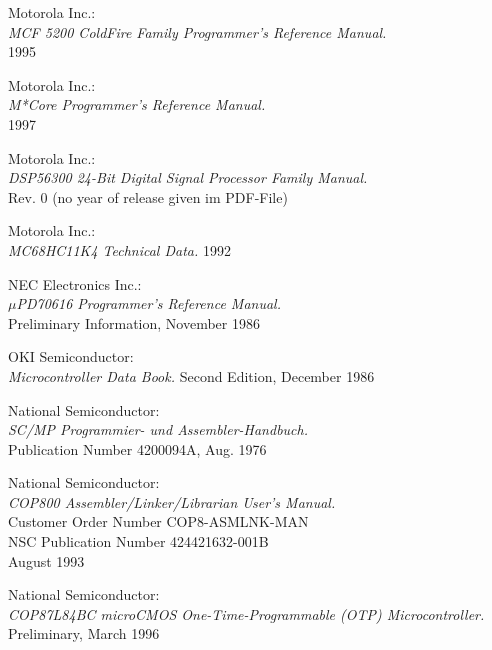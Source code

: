  Motorola Inc.: \\
                  {\em MCF 5200 ColdFire Family Programmer's Reference
                   Manual.\/} \\
                  1995

 Motorola Inc.: \\
                   {\em M*Core Programmer's Reference Manual.\/} \\
                   1997

 Motorola Inc.: \\
                   {\em DSP56300 24-Bit Digital Signal Processor
                    Family Manual.\/} \\
                   Rev. 0 (no year of release given im PDF-File)

 Motorola Inc.: \\
                {\em MC68HC11K4 Technical Data.\/}
                1992

 NEC Electronics Inc.: \\
                {\em $\mu$PD70616 Programmer's Reference Manual.\/} \\
                Preliminary Information, November 1986

 OKI Semiconductor: \\
                {\em Microcontroller Data Book.\/}
                Second Edition, December 1986

 National Semiconductor: \\
               {\em SC/MP Program\-mier- und
                As\-sem\-bler-Hand\-buch.\/} \\
               Publication Number 4200094A, Aug. 1976

 National Semiconductor: \\
                 {\em COP800 Assembler/Linker/Librarian User's
                 Manual.\/} \\
                 Customer Order Number COP8-ASMLNK-MAN \\
                 NSC Publication Number 424421632-001B \\
                 August 1993

 National Semiconductor: \\
                   {\em COP87L84BC microCMOS One-Time-Programmable (OTP)
                    Microcontroller.\/} \\
                   Preliminary, March 1996

